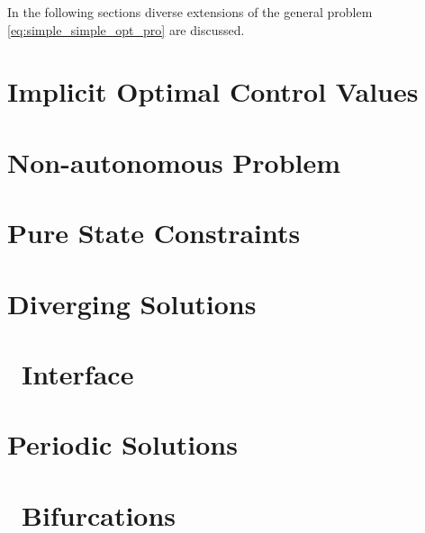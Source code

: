 In the following sections diverse extensions of the general problem \cref{eq:simple_simple_opt_pro} are discussed.
\section{Implicit Optimal Control Values}
\label{sec:ImplicitOptimalControlValues}

\section{Non-autonomous Problem}
\label{sec:NonAutonomousProblem}

\section{Pure State Constraints}
\label{sec:PureStateConstraints}

\section{Diverging Solutions}
\label{sec:DivergingSolutions}

\section{\MATCONT\ Interface}
\label{sec:MATCONTInterface}

\section{Periodic Solutions}
\label{sec:PeriodicSolutions}

\section{\BVP\ Bifurcations}
\label{sec:BVPBifurcations}
